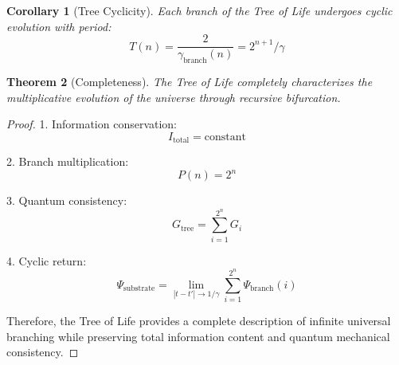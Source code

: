 \documentclass{article}
\newtheorem{theorem}{Theorem}
\newtheorem{corollary}[theorem]{Corollary}
\begin{document}
\begin{corollary}[Tree Cyclicity]
Each branch of the Tree of Life undergoes cyclic evolution with period:
\begin{equation}
T(n) = \frac{2}{\gamma_{\text{branch}}(n)} = 2^{n+1}/\gamma
\end{equation}
\end{corollary}

\begin{theorem}[Completeness]
The Tree of Life completely characterizes the multiplicative evolution of the universe through recursive bifurcation.
\end{theorem}

\begin{proof}
1. Information conservation:
   \begin{equation}
   I_{\text{total}} = \text{constant}
   \end{equation}

2. Branch multiplication:
   \begin{equation}
   P(n) = 2^{n}
   \end{equation}

3. Quantum consistency:
   \begin{equation}
   G_{\text{tree}} = \sum_{i=1}^{2^{n}} G_i
   \end{equation}

4. Cyclic return:
   \begin{equation}
   \Psi_{\text{substrate}} = \lim_{|t-t'| \to 1/\gamma} \sum_{i=1}^{2^{n}} \Psi_{\text{branch}}(i)
   \end{equation}

Therefore, the Tree of Life provides a complete description of infinite universal branching while preserving total information content and quantum mechanical consistency.
\end{proof}
\end{document}
